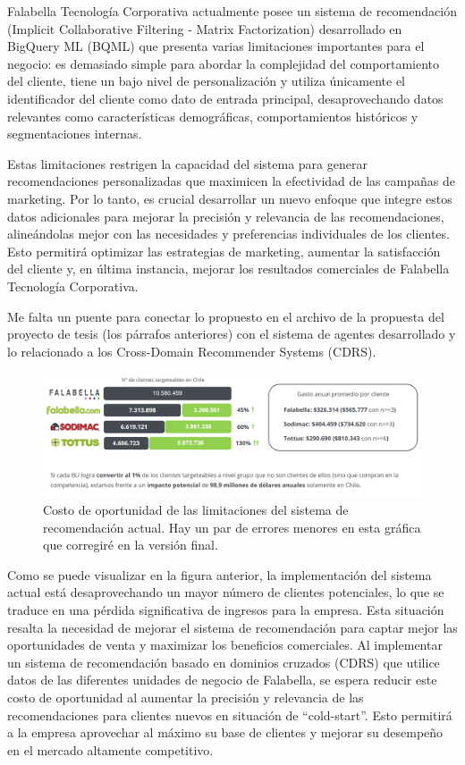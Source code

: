 \newpage

Falabella Tecnología Corporativa actualmente posee un sistema de recomendación (Implicit Collaborative Filtering - Matrix Factorization) desarrollado en BigQuery ML (BQML) que presenta varias limitaciones importantes para el negocio: es demasiado simple para abordar la complejidad del comportamiento del cliente, tiene un bajo nivel de personalización y utiliza únicamente el identificador del cliente como dato de entrada principal, desaprovechando datos relevantes como características demográficas, comportamientos históricos y segmentaciones internas.

Estas limitaciones restrigen la capacidad del sistema para generar recomendaciones personalizadas que maximicen la efectividad de las campañas de marketing. Por lo tanto, es crucial desarrollar un nuevo enfoque que integre estos datos adicionales para mejorar la precisión y relevancia de las recomendaciones, alineándolas mejor con las necesidades y preferencias individuales de los clientes. Esto permitirá optimizar las estrategias de marketing, aumentar la satisfacción del cliente y, en última instancia, mejorar los resultados comerciales de Falabella Tecnología Corporativa.

Me falta un puente para conectar lo propuesto en el archivo de la propuesta del proyecto de tesis (los párrafos anteriores) con el sistema de agentes desarrollado y lo relacionado a los Cross-Domain Recommender Systems (CDRS).

\begin{figure}[th]
	\centering
	\includegraphics[width=\textwidth]{Figures/grafica Matias.png}
	\caption{Costo de oportunidad de las limitaciones del sistema de recomendación actual. Hay un par de errores menores en esta gráfica que corregiré en la versión final.}
	\label{fig:Limitaciones_Sistema_Actual}
\end{figure}

Como se puede visualizar en la figura anterior, la implementación del sistema actual está desaprovechando un mayor número de clientes potenciales, lo que se traduce en una pérdida significativa de ingresos para la empresa. Esta situación resalta la necesidad de mejorar el sistema de recomendación para captar mejor las oportunidades de venta y maximizar los beneficios comerciales. Al implementar un sistema de recomendación basado en dominios cruzados (CDRS) que utilice datos de las diferentes unidades de negocio de Falabella, se espera reducir este costo de oportunidad al aumentar la precisión y relevancia de las recomendaciones para clientes nuevos en situación de \enquote{cold-start}. Esto permitirá a la empresa aprovechar al máximo su base de clientes y mejorar su desempeño en el mercado altamente competitivo.